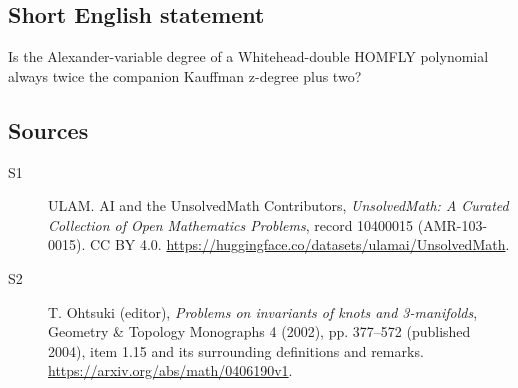 \documentclass[11pt]{article}
\begin{document}
\subsection{Short English statement}
Is the Alexander-variable degree of a Whitehead-double HOMFLY polynomial always twice the companion Kauffman z-degree plus two?
\subsection{Sources}
\begin{description}
\item[\hypertarget{source:10400015:1}{S1}] ULAM. AI and the UnsolvedMath Contributors, \emph{UnsolvedMath: A Curated Collection of Open Mathematics Problems}, record 10400015 (AMR-103-0015). CC BY 4.0. \url{https://huggingface.co/datasets/ulamai/UnsolvedMath}.
\item[\hypertarget{source:10400015:2}{S2}] T. Ohtsuki (editor), \emph{Problems on invariants of knots and 3-manifolds}, Geometry \& Topology Monographs 4 (2002), pp. 377--572 (published 2004), item 1.15 and its surrounding definitions and remarks. \url{https://arxiv.org/abs/math/0406190v1}.
\end{description}
\label{end:10400015}
\end{document}
